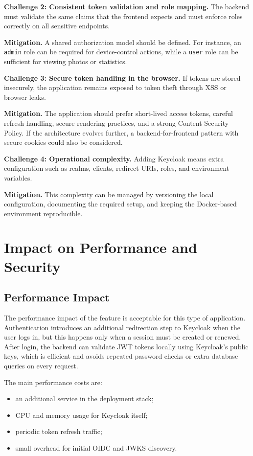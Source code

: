 \documentclass[conference]{IEEEtran}
\begin{document}
\textbf{Challenge 2: Consistent token validation and role mapping.} The backend must validate the same claims that the frontend expects and must enforce roles correctly on all sensitive endpoints.

\textbf{Mitigation.} A shared authorization model should be defined. For instance, an \texttt{admin} role can be required for device-control actions, while a \texttt{user} role can be sufficient for viewing photos or statistics.

\textbf{Challenge 3: Secure token handling in the browser.} If tokens are stored insecurely, the application remains exposed to token theft through XSS or browser leaks.

\textbf{Mitigation.} The application should prefer short-lived access tokens, careful refresh handling, secure rendering practices, and a strong Content Security Policy. If the architecture evolves further, a backend-for-frontend pattern with secure cookies could also be considered.

\textbf{Challenge 4: Operational complexity.} Adding Keycloak means extra configuration such as realms, clients, redirect URIs, roles, and environment variables.

\textbf{Mitigation.} This complexity can be managed by versioning the local configuration, documenting the required setup, and keeping the Docker-based environment reproducible.

\section{Impact on Performance and Security}

\subsection{Performance Impact}

The performance impact of the feature is acceptable for this type of application. Authentication introduces an additional redirection step to Keycloak when the user logs in, but this happens only when a session must be created or renewed. After login, the backend can validate JWT tokens locally using Keycloak's public keys, which is efficient and avoids repeated password checks or extra database queries on every request.

The main performance costs are:

\begin{itemize}
\item an additional service in the deployment stack;
\item CPU and memory usage for Keycloak itself;
\item periodic token refresh traffic;
\item small overhead for initial OIDC and JWKS discovery.
\end{itemize}
\end{document}

